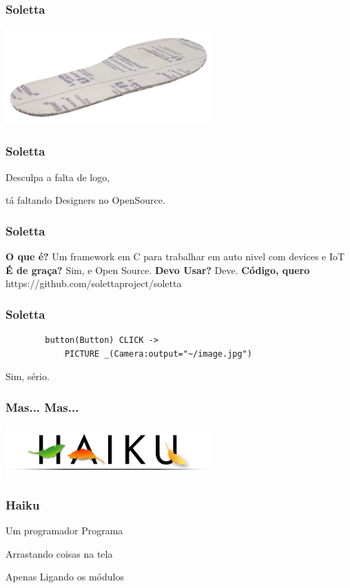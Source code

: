 \documentclass{beamer}
\begin{document}
\begin{frame} \frametitle{ Soletta }
        \includegraphics[width=300px]{images/soletta}
\end{frame}

\begin{frame} \frametitle{ Soletta }
    \begin{center}
    Desculpa a falta de logo,

    tá faltando Designers no OpenSource.
    \end{center}
\end{frame}

\begin{frame} \frametitle{ Soletta }
    \textbf{O que é?}
\linebreak
    Um framework em C para trabalhar em auto nivel com devices e IoT
\linebreak
    \textbf{É de graça?}
\linebreak
    Sim, e Open Source.
\linebreak
    \textbf{Devo Usar?}
\linebreak
    Deve.
\linebreak
    \textbf{Código, quero}
\linebreak
    https://github.com/solettaproject/soletta
\end{frame}

\begin{frame}[fragile] \frametitle{ Soletta }
    \begin{lstlisting}
        button(Button) CLICK ->
            PICTURE _(Camera:output="~/image.jpg")
    \end{lstlisting}
    \pause

    Sim, sério.
\end{frame}

\begin{frame} \frametitle{Mas... Mas...}
    \includegraphics[width=300px]{images/haiku}
\end{frame}

\begin{frame} \frametitle{ Haiku }
    \begin{center}
        Um programador Programa

        Arrastando coisas na tela

        Apenas Ligando os módulos
    \end{center}
\end{frame}
\end{document}
